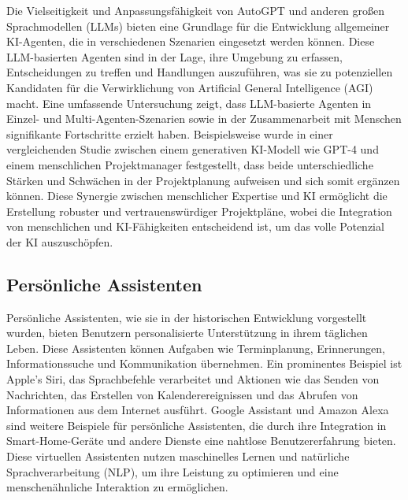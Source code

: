 \documentclass[conference]{IEEEtran}
\begin{document}
Die Vielseitigkeit und Anpassungsfähigkeit von AutoGPT und anderen großen Sprachmodellen (LLMs) bieten eine Grundlage für die Entwicklung allgemeiner KI-Agenten, die in verschiedenen Szenarien eingesetzt werden können. Diese LLM-basierten Agenten sind in der Lage, ihre Umgebung zu erfassen, Entscheidungen zu treffen und Handlungen auszuführen, was sie zu potenziellen Kandidaten für die Verwirklichung von Artificial General Intelligence (AGI) macht. Eine umfassende Untersuchung zeigt, dass LLM-basierte Agenten in Einzel- und Multi-Agenten-Szenarien sowie in der Zusammenarbeit mit Menschen signifikante Fortschritte erzielt haben\cite{xi_rise_2023}. Beispielsweise wurde in einer vergleichenden Studie zwischen einem generativen KI-Modell wie GPT-4 und einem menschlichen Projektmanager festgestellt, dass beide unterschiedliche Stärken und Schwächen in der Projektplanung aufweisen und sich somit ergänzen können. Diese Synergie zwischen menschlicher Expertise und KI ermöglicht die Erstellung robuster und vertrauenswürdiger Projektpläne, wobei die Integration von menschlichen und KI-Fähigkeiten entscheidend ist, um das volle Potenzial der KI auszuschöpfen\cite{barcaui_who_2023}.

\subsection{Persönliche Assistenten}

Persönliche Assistenten, wie sie in der historischen Entwicklung vorgestellt wurden, bieten Benutzern personalisierte Unterstützung in ihrem täglichen Leben. Diese Assistenten können Aufgaben wie Terminplanung, Erinnerungen, Informationssuche und Kommunikation übernehmen. Ein prominentes Beispiel ist Apple's Siri, das Sprachbefehle verarbeitet und Aktionen wie das Senden von Nachrichten, das Erstellen von Kalenderereignissen und das Abrufen von Informationen aus dem Internet ausführt. Google Assistant und Amazon Alexa sind weitere Beispiele für persönliche Assistenten, die durch ihre Integration in Smart-Home-Geräte und andere Dienste eine nahtlose Benutzererfahrung bieten. Diese virtuellen Assistenten nutzen maschinelles Lernen und natürliche Sprachverarbeitung (NLP), um ihre Leistung zu optimieren und eine menschenähnliche Interaktion zu ermöglichen\cite{madhuri_survey_2020}.
\end{document}
